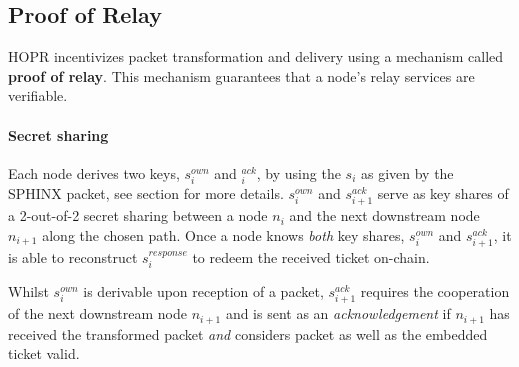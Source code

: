 \subsection{Proof of Relay}
\label{sec:proofofrelay}

HOPR incentivizes packet transformation and delivery using a mechanism called \textbf{proof of relay}. This mechanism guarantees that a node's relay services are verifiable.

\paragraph{Secret sharing}
\label{sec:proofofrelay:secretSharing}

Each node derives two keys, $s_i^{own}$ and $_i^{ack}$, by using the $s_i$ as given by the SPHINX packet, see section  for more details. $s_i^{own}$ and $s_{i+1}^{ack}$ serve as key shares of a 2-out-of-2 secret sharing between a node $n_i$ and the next downstream node $n_{i+1}$ along the chosen path. Once a node knows \textit{both} key shares, $s_i^{own}$ and $s_{i+1}^{ack}$, it is able to reconstruct $s_i^{response}$ to redeem the received ticket on-chain.

Whilst $s_i^{own}$ is derivable upon reception of a packet, $s_{i+1}^{ack}$ requires the cooperation of the next downstream node $n_{i+1}$ and is sent as an \textit{acknowledgement} if $n_{i+1}$ has received the transformed packet \textit{and} considers packet as well as the embedded ticket valid.


